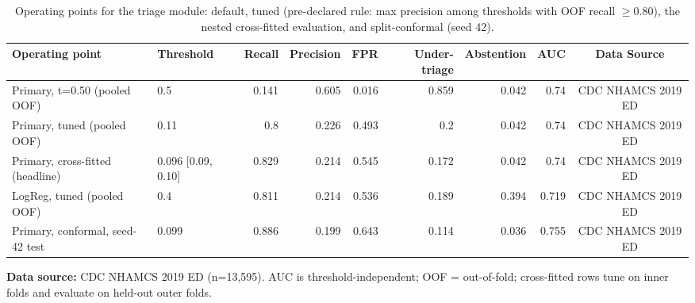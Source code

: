 \begin{table}[t]
\centering
\caption{Operating points for the triage module: default, tuned (pre-declared rule: max precision among thresholds with OOF recall $\geq 0.80$), the nested cross-fitted evaluation, and split-conformal (seed 42).}
\label{tab:operating_points}
\begin{adjustbox}{max width=0.98\textwidth}
\begin{tabular}{llrrrrrrc}
\toprule
Operating point & Threshold & Recall & Precision & FPR & Under-triage & Abstention & AUC & Data Source \\
\midrule
Primary, t=0.50 (pooled OOF) & 0.5 & 0.141 & 0.605 & 0.016 & 0.859 & 0.042 & 0.74 & CDC NHAMCS 2019 ED \\
Primary, tuned (pooled OOF) & 0.11 & 0.8 & 0.226 & 0.493 & 0.2 & 0.042 & 0.74 & CDC NHAMCS 2019 ED \\
Primary, cross-fitted (headline) & 0.096 [0.09, 0.10] & 0.829 & 0.214 & 0.545 & 0.172 & 0.042 & 0.74 & CDC NHAMCS 2019 ED \\
LogReg, tuned (pooled OOF) & 0.4 & 0.811 & 0.214 & 0.536 & 0.189 & 0.394 & 0.719 & CDC NHAMCS 2019 ED \\
Primary, conformal, seed-42 test & 0.099 & 0.886 & 0.199 & 0.643 & 0.114 & 0.036 & 0.755 & CDC NHAMCS 2019 ED \\
\bottomrule
\end{tabular}
\end{adjustbox}
\par\vspace{2pt}\raggedright\footnotesize \textbf{Data source:} CDC NHAMCS 2019 ED (n=13,595). AUC is threshold-independent; OOF = out-of-fold; cross-fitted rows tune on inner folds and evaluate on held-out outer folds.
\end{table}
